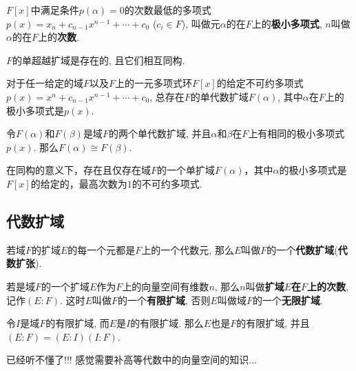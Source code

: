 \begin{Definition}[极小多项式]
$F[x]$中满足条件$p(\alpha) = 0$的次数最低的多项式
$p(x) = x_n + c_{n-1} x^{n-1} + \cdots + c_0$ ($c_i \in F$), 叫做元$\alpha$的在$F$上的\textbf{极小多项式}, $n$叫做$\alpha$的在$F$上的\textbf{次数}.
\end{Definition}

\begin{Note}
$F$的单超越扩域是存在的, 且它们相互同构.
\end{Note}

\begin{Theorem}
对于任一给定的域$F$以及$F$上的一元多项式环$F[x]$的给定不可约多项式
$p(x) = x^n + c_{n-1} x^{n-1} + \cdots + c_0$, 总存在$F$的单代数扩域$F(\alpha)$, 
其中$\alpha$在$F$上的极小多项式是$p(x)$.
\end{Theorem}

\begin{Theorem}
令$F(\alpha)$和$F(\beta)$是域$F$的两个单代数扩域, 并且$\alpha$和$\beta$在$F$上有相同的极小多项式$p(x)$. 那么$F(\alpha) \cong F(\beta)$.
\end{Theorem}

\begin{Theorem}
在同构的意义下，存在且仅存在域$F$的一个单扩域$F(\alpha)$，其中$\alpha$的极小多项式是$F[x]$的给定的，最高次数为$1$的不可约多项式.
\end{Theorem}

\subsection{代数扩域}

\begin{Theorem}[代数扩域]
若域$F$的扩域$E$的每一个元都是$F$上的一个代数元, 那么$E$叫做$F$的一个\textbf{代数扩域}(\textbf{代数扩张}).
\end{Theorem}

\begin{Definition}
若是域$F$的一个扩域$E$作为$F$上的向量空间有维数$n$, 那么$n$叫做\textbf{扩域$E$在$F$上的次数}, 记作$(E:F)$.
这时$E$叫做$F$的一个\textbf{有限扩域}, 否则$E$叫做域$F$的一个\textbf{无限扩域}.
\end{Definition}

\begin{Theorem}
令$I$是域$F$的有限扩域, 而$E$是$I$的有限扩域. 那么$E$也是$F$的有限扩域, 并且$(E:F) = (E:I)(I:F)$.
\end{Theorem}

\begin{Note}
已经听不懂了!!! 感觉需要补高等代数中的向量空间的知识...
\end{Note}